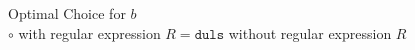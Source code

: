 \begin{figure}[tbh]
\caption[Choosing a shift base]{Optimal Choice for $b$\\$\circ$ with regular expression $R=\mathtt{duls}$ \hspace*{5em} \textbullet without regular expression $R$ }\label{fig:choiceb}
\end{figure}

% 	      
% 	
